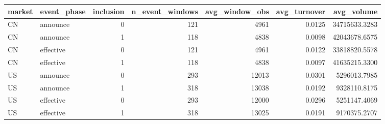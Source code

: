 \begin{tabular}{llrrrrr}
\toprule
market & event_phase & inclusion & n_event_windows & avg_window_obs & avg_turnover & avg_volume \\
\midrule
CN & announce & 0 & 121 & 4961 & 0.0125 & 34715633.3283 \\
CN & announce & 1 & 118 & 4838 & 0.0098 & 42043678.6575 \\
CN & effective & 0 & 121 & 4961 & 0.0122 & 33818820.5578 \\
CN & effective & 1 & 118 & 4838 & 0.0097 & 41635215.3300 \\
US & announce & 0 & 293 & 12013 & 0.0301 & 5296013.7985 \\
US & announce & 1 & 318 & 13038 & 0.0192 & 9328110.8175 \\
US & effective & 0 & 293 & 12000 & 0.0296 & 5251147.4069 \\
US & effective & 1 & 318 & 13025 & 0.0191 & 9170375.2707 \\
\bottomrule
\end{tabular}
